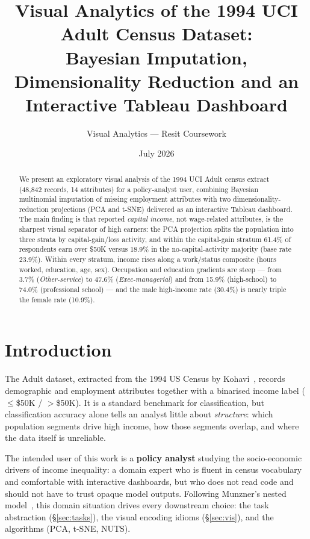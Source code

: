 \documentclass[11pt,a4paper]{article}
\title{Visual Analytics of the 1994 UCI Adult Census Dataset:\\
Bayesian Imputation, Dimensionality Reduction and an Interactive Tableau Dashboard}
\author{Visual Analytics --- Resit Coursework}
\date{July 2026}
\begin{document}
\maketitle

\begin{abstract}
\noindent We present an exploratory visual analysis of the 1994 UCI Adult
census extract (48{,}842 records, 14 attributes) for a policy-analyst user,
combining Bayesian multinomial imputation of missing employment attributes
with two dimensionality-reduction projections (PCA and t-SNE) delivered as
an interactive Tableau dashboard. The main finding is that reported
\emph{capital income}, not wage-related attributes, is the sharpest visual
separator of high earners: the PCA projection splits the population into
three strata by capital-gain/loss activity, and within the capital-gain
stratum 61.4\% of respondents earn over \$50K versus 18.9\% in the
no-capital-activity majority (base rate 23.9\%). Within every stratum,
income rises along a work/status composite (hours worked, education, age,
sex). Occupation and education gradients are steep --- from 3.7\%
(\textit{Other-service}) to 47.6\% (\textit{Exec-managerial}) and from
15.9\% (high-school) to 74.0\% (professional school) --- and the male
high-income rate (30.4\%) is nearly triple the female rate (10.9\%).
\end{abstract}

\section{Introduction}\label{sec:intro}
The Adult dataset, extracted from the 1994 US Census by Kohavi~\cite{kohavi},
records demographic and employment attributes together with a binarised
income label ($\leq$\$50K / $>$\$50K). It is a standard benchmark for
classification, but classification accuracy alone tells an analyst little
about \emph{structure}: which population segments drive high income, how
those segments overlap, and where the data itself is unreliable.

The intended user of this work is a \textbf{policy analyst} studying the
socio-economic drivers of income inequality: a domain expert who is fluent in
census vocabulary and comfortable with interactive dashboards, but who does
not read code and should not have to trust opaque model outputs. Following
Munzner's nested model~\cite[Ch.~4]{munzner}, this domain situation drives
every downstream choice: the task abstraction (\S\ref{sec:tasks}), the visual
encoding idioms (\S\ref{sec:vis}), and the algorithms (PCA, t-SNE, NUTS).
\end{document}
